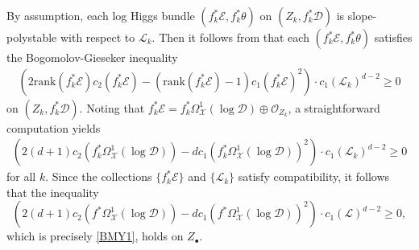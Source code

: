 \documentclass[a4paper]{amsart}
\theoremstyle{definition}
\begin{document}
By assumption, each log Higgs bundle $(f_k^*\mathcal{E},f_k^*\theta)$ on $(Z_k,f_k^*\mathscr{D})$ is slope-polystable with respect to $\mathcal{L}_k$. Then it follows from \cite[Theorem 6.5]{mochizuki_asterisque} that each $(f_k^*\mathcal{E},f_k^*\theta)$ satisfies the Bogomolov-Gieseker inequality
\begin{align*}\label{BMY2}
    (2\mathrm{rank}(f_k^*\mathcal{E})c_2(f_k^*\mathcal{E})-(\mathrm{rank}(f_k^*\mathcal{E})-1)c_1(f_k^*\mathcal{E})^2)\cdot c_1(\mathcal{L}_k)^{d-2}\ge0
\end{align*}
on $(Z_k,f_k^*\mathscr{D})$. Noting that $f_k^*\mathcal{E}=f_k^*\Omega^1_{\mathscr{X}}(\log \mathscr{D})\oplus\mathcal{O}_{Z_k}$, a straightforward computation yields
\begin{align*}
    (2(d+1)c_2(f_k^*\Omega^1_{\mathscr{X}}(\log \mathscr{D}))-dc_1(f_k^*\Omega^1_{\mathscr{X}}(\log \mathscr{D}))^2)\cdot c_1(\mathcal{L}_k)^{d-2}\ge0
\end{align*}
for all $k$. Since the collections $\{f_k^*\mathcal{E}\}$ and $\{\mathcal{L}_k\}$ satisfy compatibility, it follows that the inequality
\[
(2(d+1)c_2(f^*\Omega^1_{\mathscr{X}}(\log \mathscr{D}))-dc_1(f^*\Omega^1_{\mathscr{X}}(\log \mathscr{D}))^2)\cdot c_1(\mathcal{L})^{d-2}\ge0,
\] 
which is precisely \ref{BMY1}, holds on $Z_\bullet$. 
\end{document}
